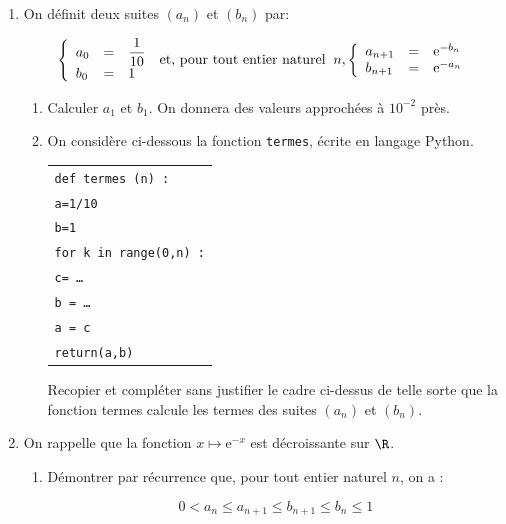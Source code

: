 \begin{enumerate}
\item On définit deux suites $\left(a_n\right)$ et $\left(b_n\right)$ par:

\[\left\{\begin{array}{l c l}
a_0& =& \dfrac{1}{10}\\
b_0& =& 1
\end{array}\right.\: \text{et, pour tout entier naturel }\: n,\left\{\begin{array}{l c l}
a_{n+1}&=&\text{e}^{-b_n}\\
b_{n+1}&=&\text{e}^{-a_n}
\end{array}\right.\]

	\begin{enumerate}
		\item Calculer $a_1$ et $b_1$. On donnera des valeurs approchées à $10^{-2}$ près.
		\item On considère ci-dessous la fonction \texttt{termes}, écrite en langage Python.
		
\begin{center}

\begin{tabular}{|l|}\hline
\texttt{def termes (n) :}\\
\quad \texttt{a=1/10}\\
\quad \texttt{b=1}\\
\quad \texttt{for k in range(0,n) :}\\
\qquad \texttt{c= \ldots}\\
\qquad \texttt{b  = \ldots}\\
\qquad \texttt{a = c}\\
\quad \texttt{return(a,b)}\\ \hline
\end{tabular}
\end{center}

Recopier et compléter sans justifier le cadre ci-dessus de telle sorte que la fonction termes calcule les termes des suites $\left(a_n\right)$ et $\left(b_n\right)$.
	\end{enumerate}
\item On rappelle que la fonction $x \longmapsto \text{e}^{-x}$ est décroissante sur $\R$.
	\begin{enumerate}
		\item Démontrer par récurrence que, pour tout entier naturel $n$, on a :
		
		\[0 < a_n \leqslant a_{n+1} \leqslant b_{n+1} \leqslant b_n \leqslant 1\]
		

\end{enumerate}
\end{enumerate}
